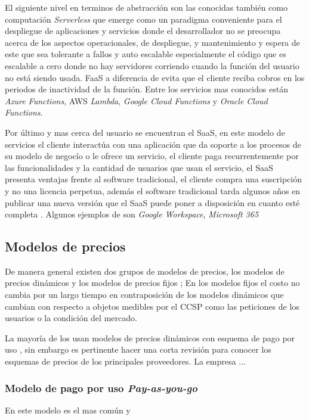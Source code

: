 El siguiente nivel en terminos de abstracción son las  conocidas también como computación \emph{Serverless} \cite[p.1]{lynn2017preliminary} que emerge como un paradigma conveniente para el despliegue de aplicaciones y servicios donde el desarrollador no se preocupa acerca de los aspectos operacionales, de despliegue, y mantenimiento y espera de este que sea tolerante a fallos y auto escalable especialmente el código que es escalable a cero donde no hay servidores corriendo cuando la función del usuario no está siendo usada. \acrshort{FaaS} a diferencia de  evita que el cliente reciba cobros en los periodos de inactividad de la función.\cite[p.5]{Baldini2017} Entre los servicios mas conocidos están \emph{Azure Functions}, \acrshort{AWS} \emph{Lambda}, \emph{Google Cloud Functions} y \emph{Oracle Cloud Functions}.\bigskip

Por último y mas cerca del usuario se encuentran el \acrfull{SaaS}, en este modelo de servicios el cliente interactúa con una aplicación que da soporte a los procesos de su modelo de negocío o le ofrece un servicio, el cliente paga recurrentemente por las funcionalidades y la cantidad de usuarios que usan el servicio, el \acrshort{SaaS} presenta ventajas frente al software tradicional, el cliente compra una suscripción y no una licencia perpetua, además el software tradicional tarda algunos años en publicar una nueva versión que el \acrshort{SaaS} puede poner a disposición en cuanto esté completa \cite[p.1]{choudhary2007software}. Algunos ejemplos de  son \emph{Google Workspace}, \emph{Microsoft 365}


\subsection{Modelos de precios}
De manera general existen dos grupos de modelos de precios, los modelos de precios dinámicos y los modelos de precios fijos \cite{al2013cloud}; En los modelos fijos el costo no cambia por un largo tiempo en contraposición de los modelos dinámicos que cambian con respecto a objetos medibles por el \acrshort{CCSP} como las peticiones de los usuarios o la condición del mercado.\bigskip

La mayoría de los  usan modelos de precios dinámicos con esquema de pago por uso \cite{al2013cloud}, sin embargo es pertinente hacer una corta revisión para conocer los esquemas de precios de los principales proveedores.\bigskip 
La empresa ...

\subsubsection{Modelo de pago por uso \emph{Pay-as-you-go}}
En este modelo es el mas común y 
